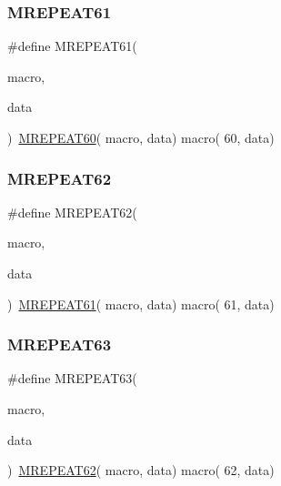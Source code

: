 \mbox{\label{group__group__sam0__utils__mrepeat_ga91e94a0bcf2b901fcc9132cd2d20e5fc}} 
\subsubsection{\texorpdfstring{MREPEAT61}{MREPEAT61}}
{\footnotesize\ttfamily \#define M\+R\+E\+P\+E\+A\+T61(\begin{DoxyParamCaption}\item[{}]{macro,  }\item[{}]{data }\end{DoxyParamCaption})~\mbox{\hyperlink{group__group__sam0__utils__mrepeat_ga4fd4e49134a22edba74f048333b8a4e6}{M\+R\+E\+P\+E\+A\+T60}}( macro, data)   macro( 60, data)}

\mbox{\label{group__group__sam0__utils__mrepeat_gac1aeda59af63e68b3212be845b9b1f5a}} 
\subsubsection{\texorpdfstring{MREPEAT62}{MREPEAT62}}
{\footnotesize\ttfamily \#define M\+R\+E\+P\+E\+A\+T62(\begin{DoxyParamCaption}\item[{}]{macro,  }\item[{}]{data }\end{DoxyParamCaption})~\mbox{\hyperlink{group__group__sam0__utils__mrepeat_ga91e94a0bcf2b901fcc9132cd2d20e5fc}{M\+R\+E\+P\+E\+A\+T61}}( macro, data)   macro( 61, data)}

\mbox{\label{group__group__sam0__utils__mrepeat_ga73cede98c09bbcf55a373fbd3cfef422}} 
\subsubsection{\texorpdfstring{MREPEAT63}{MREPEAT63}}
{\footnotesize\ttfamily \#define M\+R\+E\+P\+E\+A\+T63(\begin{DoxyParamCaption}\item[{}]{macro,  }\item[{}]{data }\end{DoxyParamCaption})~\mbox{\hyperlink{group__group__sam0__utils__mrepeat_gac1aeda59af63e68b3212be845b9b1f5a}{M\+R\+E\+P\+E\+A\+T62}}( macro, data)   macro( 62, data)}

